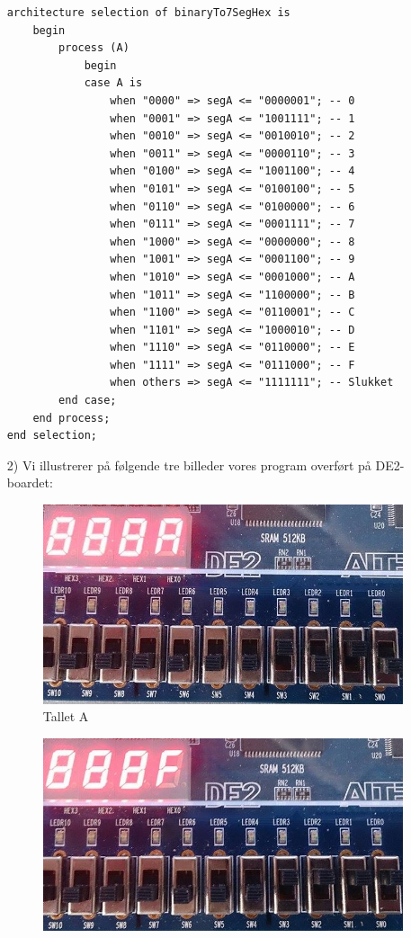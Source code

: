 \begin{enumerate}
\begin{lstlisting}[caption={Behavioral style binær til 7-segment hexadecimal},label={lst:binto7seghexa}]
architecture selection of binaryTo7SegHex is
	begin
		process (A)
			begin
			case A is
				when "0000" => segA <= "0000001"; -- 0
				when "0001" => segA <= "1001111"; -- 1
				when "0010" => segA <= "0010010"; -- 2
				when "0011" => segA <= "0000110"; -- 3
				when "0100" => segA <= "1001100"; -- 4
				when "0101" => segA <= "0100100"; -- 5
				when "0110" => segA <= "0100000"; -- 6
				when "0111" => segA <= "0001111"; -- 7
				when "1000" => segA <= "0000000"; -- 8
				when "1001" => segA <= "0001100"; -- 9
				when "1010" => segA <= "0001000"; -- A
				when "1011" => segA <= "1100000"; -- B
				when "1100" => segA <= "0110001"; -- C
				when "1101" => segA <= "1000010"; -- D
				when "1110" => segA <= "0110000"; -- E
				when "1111" => segA <= "0111000"; -- F
				when others => segA <= "1111111"; -- Slukket
		end case;
	end process;
end selection;
\end{lstlisting}
\clearpage
\item[2)]
Vi illustrerer på følgende tre billeder vores program overført på DE2-boardet:
	\begin{figure}[h]
		\centering
		\includegraphics[scale=0.3]{pictures/Oevelse5/opg2/binTo7SegHexA.JPG}
		\caption{Tallet A}
		\label{fig:binTo7SegHexA}
	\end{figure}
	\begin{figure}[h]
		\centering
		\includegraphics[scale=0.3]{pictures/Oevelse5/opg2/binTo7SegHexF.JPG}

\end{figure}
\end{enumerate}
